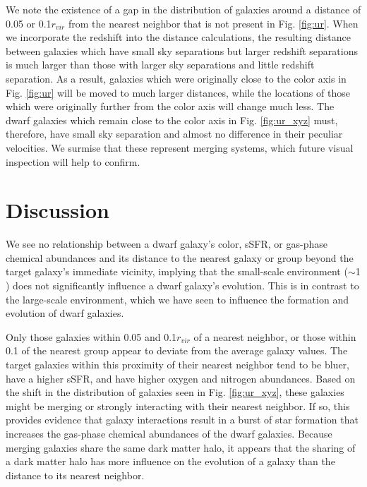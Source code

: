 We note the existence of a gap in the distribution of galaxies around a distance 
of 0.05 \hMpc or 0.1$r_{vir}$ from the nearest neighbor that is not present in 
Fig. \ref{fig:ur}.  When we incorporate the redshift into the distance 
calculations, the resulting distance between galaxies which have small sky 
separations but larger redshift separations is much larger than those with 
larger sky separations and little redshift separation.  As a result, galaxies 
which were originally close to the color axis in Fig. \ref{fig:ur} will be 
moved to much larger distances, while the locations of those which were 
originally further from the color axis will change much less.  The dwarf 
galaxies which remain close to the color axis in Fig. \ref{fig:ur_xyz} must, 
therefore, have small sky separation and almost no difference in their peculiar 
velocities.  We surmise that these represent merging systems, which future 
visual inspection will help to confirm.




\section[Discussion]{Discussion}

We see no relationship between a dwarf galaxy's color, sSFR, or gas-phase 
chemical abundances and its distance to the nearest galaxy or group beyond the 
target galaxy's immediate vicinity, implying that the small-scale environment 
($\sim$1 \hMpc) does not significantly influence a dwarf galaxy's evolution.  
This is in contrast to the large-scale environment, which we have seen to 
influence the formation and evolution of dwarf galaxies.

Only those galaxies within 0.05 \hMpc and 0.1$r_{vir}$ of a nearest neighbor, or 
those within 0.1 \hMpc of the nearest group appear to deviate from the average 
galaxy values.  The target galaxies within this proximity of their nearest 
neighbor tend to be bluer, have a higher sSFR, and have higher oxygen and 
nitrogen abundances.  Based on the shift in the distribution of galaxies seen in 
Fig. \ref{fig:ur_xyz}, these galaxies might be merging or strongly interacting 
with their nearest neighbor.  If so, this provides evidence that galaxy 
interactions result in a burst of star formation that increases the gas-phase 
chemical abundances of the dwarf galaxies.  Because merging galaxies share the 
same dark matter halo, it appears that the sharing of a dark matter halo has 
more influence on the evolution of a galaxy than the distance to its nearest 
neighbor.

